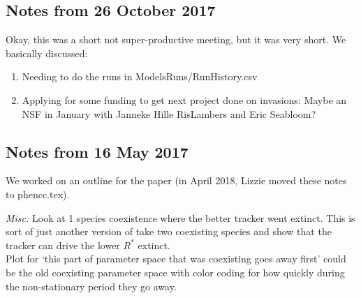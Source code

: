 \documentclass[11pt,a4paper,oneside]{article}
\begin{document}
\subsection{Notes from 26 October 2017}
Okay, this was a short not super-productive meeting, but it was very short. We basically discussed:
\begin{enumerate} 
\item Needing to do the runs in ModelsRuns/RunHistory.csv
\item Applying for some funding to get next project done on invasions: Maybe an NSF in January with Janneke Hille RisLambers and Eric Seabloom?
\end{enumerate} 

\subsection{Notes from 16 May 2017}
We worked on an outline for the paper (in April 2018, Lizzie moved these notes to phencc.tex).

\emph{Misc:} 
Look at 1 species coexistence where the better tracker went extinct. This is sort of just another version of take two coexisting species and show that the tracker can drive the lower $R^*$ extinct.\\

Plot for `this part of parameter space that was coexisting goes away first' could be the old coexisting parameter space with color coding for how quickly during the non-stationary period they go away. 
\end{document}
